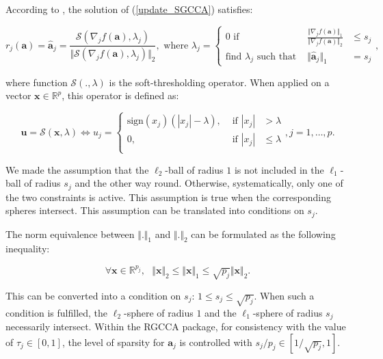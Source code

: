 \documentclass[
]{jss}
\begin{document}
According to \cite{Witten2009a}, the solution of (\ref{update_SGCCA})
satisfies:

\begin{equation}
    r_j( \mathbf a) = \hat{ \mathbf a}_j = \frac{\mathcal{S}(\nabla_j f( \mathbf a), \lambda_j)}{\Vert \mathcal{S}(\nabla_j f( \mathbf a), \lambda_j)\Vert_2}, \text{ where } \lambda_j = \left\lbrace\begin{array}{ccc}
    0 \text{ if } & \frac{\Vert \nabla_j f( \mathbf a) \Vert_1}{\Vert \nabla_j f( \mathbf a) \Vert_2} & \leq s_j\\
    \text{find } \lambda_j \text{ such that } & \Vert \hat{ \mathbf a}_j \Vert_1 & = s_j    \end{array}\right.,
    \label{SGCCA_sol}
\end{equation}

where function \(\mathcal{S}(., \lambda)\) is the soft-thresholding
operator. When applied on a vector \(\mathbf x\in\mathbb{R}^p\), this
operator is defined as:

\begin{equation}
     \mathbf u = \mathcal{S}(\mathbf x, \lambda) \Leftrightarrow u_j = \left\lbrace
    \begin{array}{ccc}
        {\mathrm{sign}}(x_j)(|x_j| -  \lambda), & \text{ if } |x_j| &> \lambda\\
        0, & \text{ if } |x_j| &\leq \lambda\\ 
    \end{array}\right., j = 1, \ldots, p.
\end{equation}

We made the assumption that the \(\ell_2\)-ball of radius \(1\) is not
included in the \(\ell_1\)-ball of radius \(s_j\) and the other way
round. Otherwise, systematically, only one of the two constraints is
active. This assumption is true when the corresponding spheres
intersect. This assumption can be translated into conditions on \(s_j\).

The norm equivalence between \(\Vert . \Vert_1\) and \(\Vert . \Vert_2\)
can be formulated as the following inequality:

\begin{equation}
    \forall \mathbf x \in \mathbb{R}^{p_j}, \text{ } \Vert \mathbf x \Vert_2 \leq \Vert \mathbf x \Vert_1 \leq \sqrt{p_j}\Vert \mathbf x \Vert_2.
\label{existence_conditions}
\end{equation}

This can be converted into a condition on \(s_j\):
\(1 \leq s_j \leq \sqrt{p_j}\). When such a condition is fulfilled, the
\(\ell_2\)-sphere of radius \(1\) and the \(\ell_1\)-sphere of radius
\(s_j\) necessarily intersect. Within the RGCCA package, for consistency
with the value of \(\tau_j \in [0, 1]\), the level of sparsity for
\(\mathbf a_j\) is controlled with \(s_j/p_j \in [1/\sqrt{p_j}, 1]\).
\end{document}
